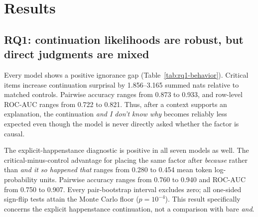 \section{Results}
\label{sec:results}

\subsection{RQ1: continuation likelihoods are robust, but direct judgments are mixed}
Every model shows a positive ignorance gap (Table~\ref{tab:rq1-behavior}). Critical items increase continuation surprisal by 1.856--3.165 summed nats relative to matched controls. Pairwise accuracy ranges from 0.873 to 0.933, and row-level ROC-AUC ranges from 0.722 to 0.821. Thus, after a context supports an explanation, the continuation \emph{and I don't know why} becomes reliably less expected even though the model is never directly asked whether the factor is causal.

The explicit-happenstance diagnostic is positive in all seven models as well. The critical-minus-control advantage for placing the same factor after \emph{because} rather than \emph{and it so happened that} ranges from 0.280 to 0.454 mean token log-probability units. Pairwise accuracy ranges from 0.760 to 0.940 and ROC-AUC from 0.750 to 0.907. Every pair-bootstrap interval excludes zero; all one-sided sign-flip tests attain the Monte Carlo floor ($p=10^{-4}$). This result specifically concerns the explicit happenstance continuation, not a comparison with bare \emph{and}.


